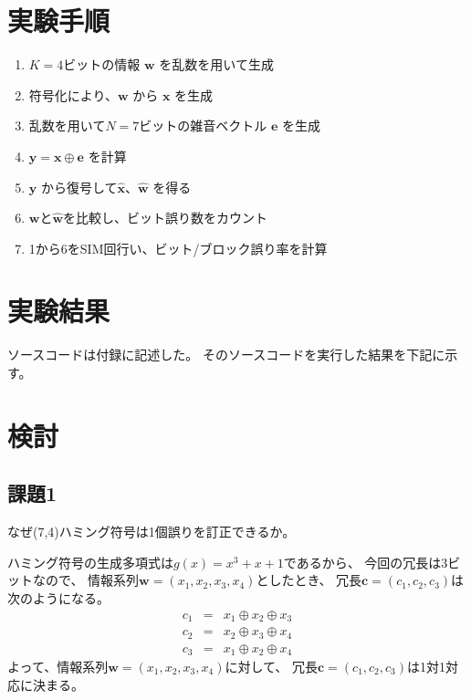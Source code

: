 \documentclass[12pt]{jarticle}
\begin{document}
\section{実験手順}
\begin{enumerate}
    \item $K=4$ビットの情報 $\boldsymbol{w}$ を乱数を用いて生成
    \item 符号化により、$\boldsymbol{w}$ から $\boldsymbol{x}$ を生成
    \item 乱数を用いて$N=7$ビットの雑音ベクトル $\boldsymbol{e}$ を生成
    \item $\boldsymbol{y}=\boldsymbol{x}\oplus \boldsymbol{e}$ を計算
    \item $\boldsymbol{y}$ から復号して$\hat{\boldsymbol{x}}$、$\hat{\boldsymbol{w}}$ を得る
    \item $\boldsymbol{w}$と$\hat{\boldsymbol{w}}$を比較し、ビット誤り数をカウント
    \item 1から6をSIM回行い、ビット/ブロック誤り率を計算
\end{enumerate}

\clearpage

\section{実験結果}

ソースコードは付録に記述した。
そのソースコードを実行した結果を下記に示す。


\clearpage

\section{検討}
\subsection{課題1}
\begin{shadebox}
    なぜ(7,4)ハミング符号は1個誤りを訂正できるか。
\end{shadebox}
ハミング符号の生成多項式は$g(x)=x^3+x+1$であるから、
今回の冗長は3ビットなので、
情報系列$\boldsymbol{w}=(x_1,x_2,x_3,x_4)$としたとき、
冗長$\boldsymbol{c}=(c_1,c_2,c_3)$は次のようになる。
\begin{eqnarray}
    c_1&=&x_1 \oplus x_2 \oplus x_3 \nonumber\\
    c_2&=&x_2 \oplus x_3 \oplus x_4 \nonumber\\
    c_3&=&x_1 \oplus x_2 \oplus x_4 \nonumber
\end{eqnarray}
よって、情報系列$\boldsymbol{w}=(x_1,x_2,x_3,x_4)$に対して、
冗長$\boldsymbol{c}=(c_1,c_2,c_3)$は1対1対応に決まる。
\end{document}
